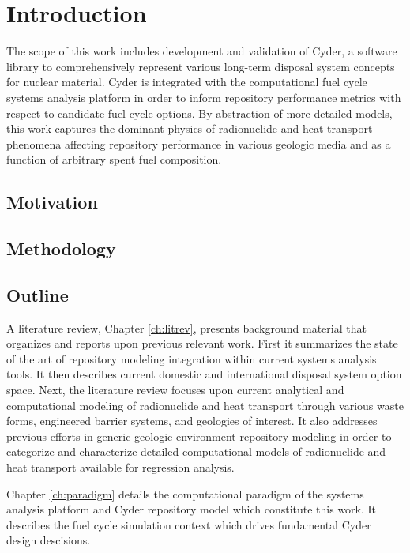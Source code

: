 \chapter{Introduction}\label{ch:introduction}


The scope of this work includes development and validation of Cyder, a software 
library to comprehensively represent various long-term disposal system concepts 
for nuclear material. Cyder is integrated with the \Cyclus 
computational fuel cycle systems analysis platform in order to inform 
repository performance metrics with respect to candidate fuel cycle options.  
By abstraction of more detailed models, this work captures the dominant physics 
of radionuclide and heat transport phenomena affecting repository performance 
in various geologic media and as a function of arbitrary spent fuel 
composition. 

\section{Motivation} 


\section{Methodology} 

\section{Outline}

A literature review, Chapter \ref{ch:litrev}, presents background material that organizes and 
reports upon previous relevant work. First it summarizes the state of the art of 
repository modeling integration within current systems analysis tools. It then 
describes current domestic and international disposal system option space. 
Next, the literature review focuses upon current analytical and 
computational modeling of radionuclide and heat transport through various waste 
forms, engineered barrier systems, and geologies of interest.  It also 
addresses previous efforts in generic geologic environment repository modeling in order to 
categorize and characterize detailed computational models of radionuclide and 
heat transport available for regression analysis.


Chapter \ref{ch:paradigm} details the computational paradigm of the \Cyclus 
systems analysis platform and Cyder repository model which constitute this work. 
It describes the \Cyclus fuel cycle simulation context which drives fundamental 
Cyder design descisions. 

